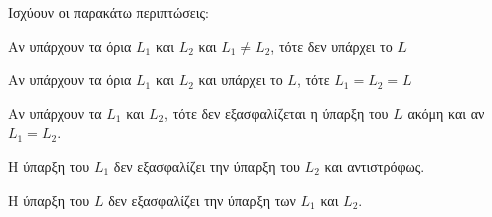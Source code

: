 Ισχύουν οι παρακάτω περιπτώσεις:
\begin{myitemize}
\item Αν υπάρχουν τα όρια $ L_{1} $ και $ L_{2} $ και $ L_{1} \neq L_{2} $, τότε
    δεν υπάρχει το $ L $
\item Αν υπάρχουν τα όρια $ L_{1} $ και $ L_{2} $ και υπάρχει το $ L $, τότε
    $ L_{1}=L_{2}=L $
\item Αν υπάρχουν τα $ L_{1} $ και $ L_{2} $, τότε δεν εξασφαλίζεται η ύπαρξη του 
    $ L $ ακόμη και αν $ L_{1}=L_{2} $.
\item Η ύπαρξη του $ L_{1} $ δεν εξασφαλίζει την ύπαρξη του $ L_{2} $ και αντιστρόφως.
\item Η ύπαρξη του $ L $ δεν εξασφαλίζει την ύπαρξη των $ L_{1} $ και $ L_{2} $.
\end{myitemize}

